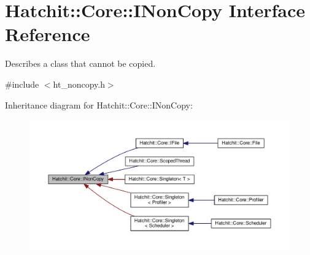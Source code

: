 \hypertarget{classHatchit_1_1Core_1_1INonCopy}{}\section{Hatchit\+:\+:Core\+:\+:I\+Non\+Copy Interface Reference}
\label{classHatchit_1_1Core_1_1INonCopy}


Describes a class that cannot be copied.  




{\ttfamily \#include $<$ht\+\_\+noncopy.\+h$>$}



Inheritance diagram for Hatchit\+:\+:Core\+:\+:I\+Non\+Copy\+:
\nopagebreak
\begin{figure}[H]
\begin{center}
\leavevmode
\includegraphics[width=350pt]{classHatchit_1_1Core_1_1INonCopy__inherit__graph}
\end{center}
\end{figure}
